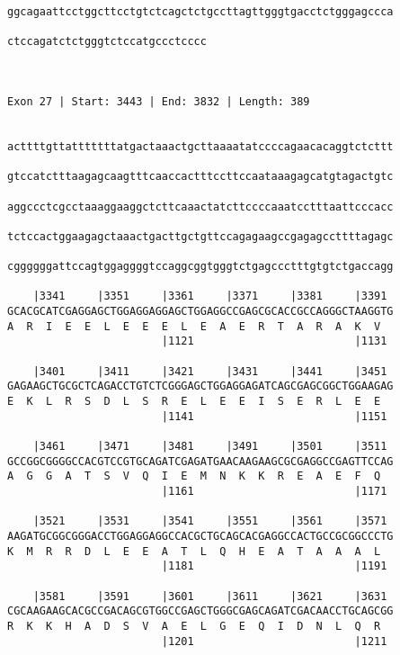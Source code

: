 \documentclass{article}
\begin{document}
\begin{Verbatim}
ggcagaattcctggcttcctgtctcagctctgccttagttgggtgacctctgggagccca
                                                            
ctccagatctctgggtctccatgccctcccc
                               
                               
 
Exon 27 | Start: 3443 | End: 3832 | Length: 389


acttttgttatttttttatgactaaactgcttaaaatatccccagaacacaggtctcttt
                                                            
gtccatctttaagagcaagtttcaaccactttccttccaataaagagcatgtagactgtc
                                                            
aggccctcgcctaaaggaaggctcttcaaactatcttccccaaatcctttaattcccacc
                                                            
tctccactggaagagctaaactgacttgctgttccagagaagccgagagccttttagagc
                                                            
cggggggattccagtggaggggtccaggcggtgggtctgagccctttgtgtctgaccagg
                                                            
    |3341     |3351     |3361     |3371     |3381     |3391 
GCACGCATCGAGGAGCTGGAGGAGGAGCTGGAGGCCGAGCGCACCGCCAGGGCTAAGGTG
A  R  I  E  E  L  E  E  E  L  E  A  E  R  T  A  R  A  K  V  
                        |1121                         |1131 
  
    |3401     |3411     |3421     |3431     |3441     |3451 
GAGAAGCTGCGCTCAGACCTGTCTCGGGAGCTGGAGGAGATCAGCGAGCGGCTGGAAGAG
E  K  L  R  S  D  L  S  R  E  L  E  E  I  S  E  R  L  E  E  
                        |1141                         |1151 
  
    |3461     |3471     |3481     |3491     |3501     |3511 
GCCGGCGGGGCCACGTCCGTGCAGATCGAGATGAACAAGAAGCGCGAGGCCGAGTTCCAG
A  G  G  A  T  S  V  Q  I  E  M  N  K  K  R  E  A  E  F  Q  
                        |1161                         |1171 
  
    |3521     |3531     |3541     |3551     |3561     |3571 
AAGATGCGGCGGGACCTGGAGGAGGCCACGCTGCAGCACGAGGCCACTGCCGCGGCCCTG
K  M  R  R  D  L  E  E  A  T  L  Q  H  E  A  T  A  A  A  L  
                        |1181                         |1191 
  
    |3581     |3591     |3601     |3611     |3621     |3631 
CGCAAGAAGCACGCCGACAGCGTGGCCGAGCTGGGCGAGCAGATCGACAACCTGCAGCGG
R  K  K  H  A  D  S  V  A  E  L  G  E  Q  I  D  N  L  Q  R  
                        |1201                         |1211 
  

\end{Verbatim}
\end{document}
